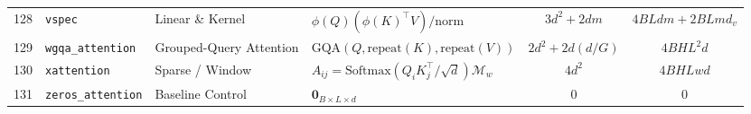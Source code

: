 \begin{center}
\begin{longtable}{rlllcc}
128 & \texttt{vspec} & Linear \& Kernel & $\phi(Q)(\phi(K)^\top V) / \text{norm}$ & $3 d^2 + 2 d m$ & $4 B L d m + 2 B L m d_v$ \\
129 & \texttt{wgqa\_attention} & Grouped-Query Attention & $\text{GQA}(Q, \text{repeat}(K), \text{repeat}(V))$ & $2 d^2 + 2 d (d / G)$ & $4 B H L^2 d$ \\
130 & \texttt{xattention} & Sparse / Window & $A_{ij} = \text{Softmax}(Q_i K_j^\top / \sqrt{d}) \mathcal{M}_w$ & $4 d^2$ & $4 B H L w d$ \\
131 & \texttt{zeros\_attention} & Baseline Control & $\mathbf{0}_{B \times L \times d}$ & $0$ & $0$ \\
\end{longtable}
\end{center}
